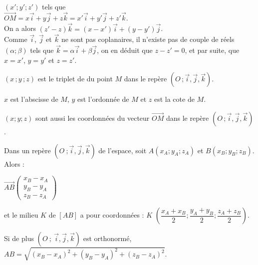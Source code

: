 \begin{preuve}
\begin{itemize}
    $(x';y';z')$ tels que\\
    $ \overrightarrow{OM}=x\overrightarrow{i}+y\overrightarrow{j}+z\overrightarrow{k}=x'\overrightarrow{i}+y'\overrightarrow{j}+z'\overrightarrow{k}$.\\
    On a alors $ (z'-z)\overrightarrow{k}=(x-x')\overrightarrow{i}+(y-y')\overrightarrow{j}$.\\
    Comme $\overrightarrow{i}$, $ \overrightarrow{j}$ et
    $\overrightarrow{k}$ ne sont pas coplanaires, il n'existe pas de
    couple de réels $(\alpha;\beta)$ tels que
    $\overrightarrow{k}=\alpha\overrightarrow{i}+\beta\overrightarrow{j}$,
    on en déduit que $z-z'=0$, et par suite, que $x=x'$, $y=y'$ et
    $z=z'$.
  \end{itemize}
\end{preuve}

\begin{definition}
  $(x\,;y\,;z)$ est le triplet de  du
  point $M$ dans le repère $(O\,;\vec{i},\vec{j},\vec{k})$.

  $x$ est l'abscisse de $M$, $y$ est l'ordonnée de $M$ et $z$ est la
  cote de $M$.  

  $(x;y;z)$ sont aussi les coordonnées du vecteur
  $\overrightarrow{OM}$ dans le repère
  $(O\,;\vec{i},\vec{j},\vec{k})$.
\end{definition}
 
\begin{proprietes}
  Dans un repère $(O\ ;\vec{i},\vec{j},\vec{k})$ de l'espace,
  soit $A(x_A;y_A;z_A)$  et $B(x_B;y_B;z_B)$.  Alors :

  $\overrightarrow{AB}\begin{pmatrix}x_B-x_A\\y_B-y_A\\z_B-z_A \end{pmatrix}$

  et le milieu $K$ de $[AB]$ a pour coordonnées :   $K$
  $(\dfrac{x_A+x_B}{2};\dfrac{y_A+y_B}{2} ;\dfrac{z_A+z_B}{2})$.

  \vspace{3mm}

  Si de plus $(O\ ;\ \vec{i},\vec{j},\vec{k})$ est orthonormé,
  $AB=\sqrt{(x_B-x_A)^2+(y_B-y_A)^2+(z_B-z_A)^2}$.
\end{proprietes}

